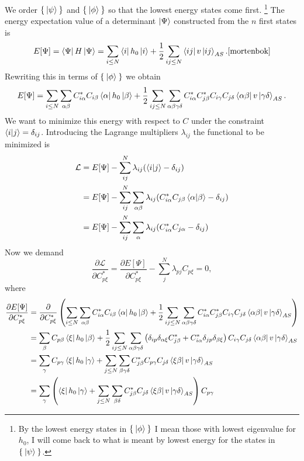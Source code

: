 \documentclass[a4paper,english,12pt]{article}
\newcommand{\p}{\partial}
\newcommand{\pddt}[2]{\frac{\p #1}{\p #2}}
\newcommand{\lagr}{\mathcal{L}}
\newcommand{\be}{\begin{equation}}
\newcommand{\ee}{\end{equation}}
\begin{document}
We order \(\Set{\Ket{\psi}}\) and  \(\Set{\Ket{\phi}}\) so that the lowest energy states come first.
\footnote{By the lowest energy states in $\Set{\Ket{\phi}}$ I mean those with lowest eigenvalue for $h_0$,
I will come back to what is meant by lowest energy for the states in $\Set{\Ket{\psi}}$.}
The energy expectation value of a determinant $\Ket{\Psi}$ constructed from the $n$ first states is
\be\label{Ei} E[\Psi] = \bra{\Psi}H\ket{\Psi} = \sum_{i\leq N}\bra{i}h_0\ket{i} + \frac{1}{2}\sum_{ij\leq N}\bra{ij}v\ket{ij}_{AS}.\cite{mortenbok}\ee
Rewriting this in terms of $\Set{\Ket{\phi}}$ we obtain
\be\label{Ea}E[\Psi] = \sum_{i\leq N}\sum_{\alpha\beta}C_{i\alpha}^*C_{i\beta}\bra{\alpha}h_0\ket{\beta} +
\frac{1}{2}\sum_{ij\leq N}\sum_{\alpha\beta\gamma\delta}C_{i\alpha}^*C_{j\beta}^*C_{i\gamma}C_{j\delta}\bra{\alpha\beta}v\ket{\gamma\delta}_{AS}.\ee
We want to minimize this energy with respect to $C$ under the constraint $\braket{i|j} = \delta_{ij}$. Introducing the Lagrange multipliers $\lambda_{ij}$
the functional to be minimized is
\begin{align*}
  \lagr &= E[\Psi] - \sum_{ij}^N\lambda_{ij}(\braket{i|j} - \delta_{ij})\\
  &=  E[\Psi] - \sum_{ij}^N\sum_{\alpha\beta}\lambda_{ij}(C_{i\alpha}^*C_{j\beta}\braket{\alpha|\beta} - \delta_{ij})\\
  &= E[\Psi] - \sum_{ij}^N\sum_{\alpha}\lambda_{ij}(C_{i\alpha}^*C_{j\alpha} - \delta_{ij})
\end{align*} 
Now we demand
\be\label{lag}  \pddt{\lagr}{C^*_{p\xi}} = \pddt{E[\Psi]}{C^*_{p\xi}} - \sum_j^N\lambda_{pj}C_{p\xi} = 0,\ee
where
\begin{align*}
\pddt{E[\Psi]}{C^*_{p\xi}} &= \pddt{}{C^*_{p\xi}}\left( \sum_{i\leq N}\sum_{\alpha\beta}C_{i\alpha}^*C_{i\beta}\bra{\alpha}h_0\ket{\beta} +
\frac{1}{2}\sum_{ij\leq N}\sum_{\alpha\beta\gamma\delta}C_{i\alpha}^*C_{j\beta}^*C_{i\gamma}C_{j\delta}\bra{\alpha\beta}v\ket{\gamma\delta}_{AS}\right)\\
&= \sum_{\beta}C_{p\beta}\bra{\xi}h_0\ket{\beta} +
\frac{1}{2}\sum_{ij\leq N}\sum_{\alpha\beta\gamma\delta}\left(\delta_{ip}\delta_{\alpha\xi}C_{j\beta}^*+
C_{i\alpha}^*\delta_{jp}\delta_{\beta\xi}\right)C_{i\gamma}C_{j\delta}\bra{\alpha\beta}v\ket{\gamma\delta}_{AS}\\
&=\sum_{\gamma}C_{p\gamma}\bra{\xi}h_0\ket{\gamma} +
\sum_{j\leq N}\sum_{\beta\gamma\delta}C_{j\beta}^*C_{p\gamma}C_{j\delta}\bra{\xi\beta}v\ket{\gamma\delta}_{AS}\\
&=\sum_\gamma\left(\bra{\xi}h_0\ket{\gamma}+\sum_{j\leq N}\sum_{\beta\delta}C_{j\beta}^*C_{j\delta}\bra{\xi\beta}v\ket{\gamma\delta}_{AS}\right)C_{p\gamma}
\end{align*}
\end{document}
